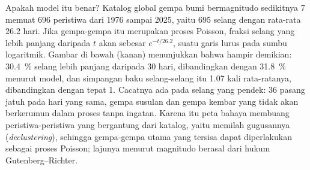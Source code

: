 Apakah model itu benar? Katalog global gempa bumi bermagnitudo sedikitnya 7 memuat 696 peristiwa
dari 1976 sampai 2025, yaitu 695 selang dengan rata-rata 26.2 hari. Jika gempa-gempa itu merupakan proses Poisson,
fraksi selang yang lebih panjang daripada $t$ akan sebesar $e^{-t/26.2}$, suatu garis lurus pada sumbu
logaritmik. Gambar di bawah (kanan) menunjukkan bahwa hampir demikian: \qty{30.4}{\percent} selang
lebih panjang daripada 30 hari, dibandingkan dengan \qty{31.8}{\percent} menurut model, dan simpangan baku
selang-selang itu 1.07 kali rata-ratanya, dibandingkan dengan tepat 1. Cacatnya ada pada selang yang pendek: 36 pasang
jatuh pada hari yang sama, gempa susulan dan gempa kembar yang tidak akan berkerumun dalam proses tanpa ingatan. Karena itu peta
bahaya membuang peristiwa-peristiwa yang bergantung dari katalog, yaitu memilah gugusannya (\textit{declustering}), sehingga
gempa-gempa utama yang tersisa dapat diperlakukan sebagai proses Poisson; lajunya menurut magnitudo berasal dari
hukum Gutenberg--Richter.

